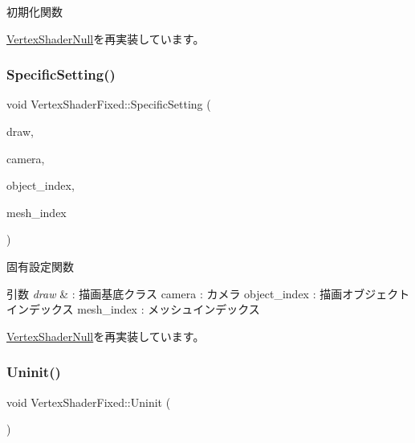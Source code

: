 初期化関数 



\mbox{\hyperlink{class_vertex_shader_null_af30eb8057fe0537bc6ade214647b6fb5}{Vertex\+Shader\+Null}}を再実装しています。

\mbox{\label{class_vertex_shader_fixed_a87523c320f6f6767d59d7b24265db7ec}} 
\subsubsection{\texorpdfstring{Specific\+Setting()}{SpecificSetting()}}
{\footnotesize\ttfamily void Vertex\+Shader\+Fixed\+::\+Specific\+Setting (\begin{DoxyParamCaption}\item[{\mbox{\hyperlink{class_draw_base}{Draw\+Base}} $\ast$}]{draw,  }\item[{\mbox{\hyperlink{class_camera}{Camera}} $\ast$}]{camera,  }\item[{unsigned}]{object\+\_\+index,  }\item[{unsigned}]{mesh\+\_\+index }\end{DoxyParamCaption})\hspace{0.3cm}{\ttfamily [virtual]}}



固有設定関数 


\begin{DoxyParams}{引数}
{\em draw} & \+: 描画基底クラス camera \+: カメラ object\+\_\+index \+: 描画オブジェクトインデックス mesh\+\_\+index \+: メッシュインデックス \\
\hline
\end{DoxyParams}


\mbox{\hyperlink{class_vertex_shader_null_aa2234c6ea083e3c0233d59f222145992}{Vertex\+Shader\+Null}}を再実装しています。

\mbox{\label{class_vertex_shader_fixed_a49f630aee4757c8fd8bae886f22dfeb0}} 
\subsubsection{\texorpdfstring{Uninit()}{Uninit()}}
{\footnotesize\ttfamily void Vertex\+Shader\+Fixed\+::\+Uninit (\begin{DoxyParamCaption}{ }\end{DoxyParamCaption})\hspace{0.3cm}{\ttfamily [virtual]}}



